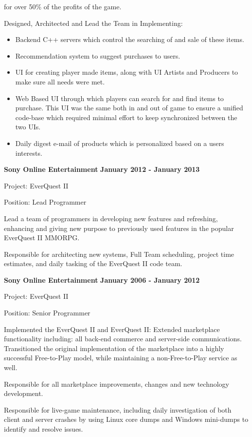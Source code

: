 \documentclass{article}
\let\Item\item
\newcommand\SpecialItem{\renewcommand\item[1][]{\Item[\textbullet~\bfseries##1]}}
\begin{document}
for over 50\% of the profits of the game.
\par
\vspace{\baselineskip}
Designed, Architected and Lead the Team in Implementing: 
\vspace{\baselineskip}
\SpecialItem
\begin{itemize}
  \item[]Backend C++ servers which control the searching of and sale of these items.
  \item[]Recommendation system to suggest purchases to users.
  \item[]UI for creating player made items, along with UI Artists  and Producers to make sure all needs were met.
  \item[]Web Based UI through which players can search for and find items to purchase.  This UI was the same both in and out of game to ensure a unified code-base which required minimal effort to keep synchronized between the two UIs.
  \item[]Daily digest e-mail of products which is personalized based on a users interests.
\end{itemize}

\vspace{\baselineskip}
{\bf Sony Online Entertainment}
\hfill {\bf January 2012 - January 2013}
\vspace{.03in}
\par
Project: EverQuest II
\par
Position: Lead Programmer
\vspace{.03in}
\par
Lead a team of programmers in developing new features and
refreshing, enhancing and giving new purpose to previously used features in
the popular EverQuest II MMORPG. 
\par
Responsible for architecting new systems, Full Team
scheduling, project time estimates, and daily tasking of the EverQuest II code team.
\par

\pagebreak

\vspace{\baselineskip}
{\bf Sony Online Entertainment} 
\hfill {\bf January 2006 - January 2012} 
\par
\vspace{.03in}
Project: EverQuest II
\par
Position: Senior Programmer
\vspace{.03in}
\par
Implemented the EverQuest II and EverQuest II: Extended marketplace functionality
including: all back-end commerce and server-side communications.  Transitioned
the original implementation of the marketplace into a highly successful Free-to-Play 
model, while maintaining a non-Free-to-Play service as well.
\par
Responsible for all marketplace improvements, changes and new technology
development.
\par
Responsible for live-game maintenance, including daily investigation of both client
and server crashes by using Linux core dumps and Windows mini-dumps to identify
and resolve issues. 
\par
\end{document}
